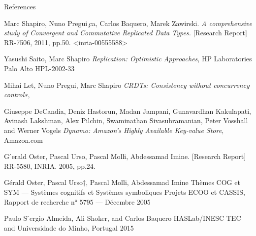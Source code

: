 \documentclass{beamer}
\begin{document}
\begin{frame}{References}

\begin{thebibliography}{1}

Marc Shapiro, Nuno Pregui ̧ca, Carlos Baquero, Marek Zawirski. 
\textit{A comprehensive study of Convergent and Commutative Replicated Data Types.} [Research Report] RR-7506, 2011, pp.50. <inria-00555588>

Yasushi Saito, Marc Shapiro
\textit{Replication: Optimistic Approaches}, HP Laboratories Palo Alto HPL-2002-33

Mihai Let, Nuno Pregui, Marc Shapiro
\textit{CRDTs: Consistency without concurrency control∗},

Giuseppe DeCandia, Deniz Hastorun, Madan Jampani, Gunavardhan Kakulapati, Avinash Lakshman, Alex Pilchin, Swaminathan Sivasubramanian, Peter Vosshall and Werner Vogels
\textit{Dynamo: Amazon’s Highly Available Key-value Store}, Amazon.com

G ́erald Oster, Pascal Urso, Pascal Molli, Abdessamad Imine. 
 [Research Report] RR-5580, INRIA. 2005, pp.24.

Gérald Oster, Pascal Urso†, Pascal Molli, Abdessamad Imine
Thèmes COG et SYM — Systèmes cognitifs et Systèmes symboliques
Projets ECOO et CASSIS, Rapport de recherche n° 5795 — Décembre 2005

Paulo S ́ergio Almeida, Ali Shoker, and Carlos Baquero
HASLab/INESC TEC and Universidade do Minho, Portugal 2015

\end{thebibliography}	

\end{frame}

\begin{frame}
\end{frame}
\end{document}
